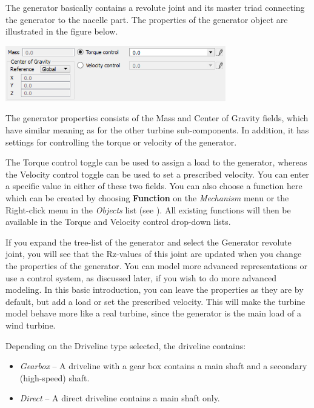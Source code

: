 
The generator basically contains a revolute joint and its master triad
connecting the generator to the nacelle part. The properties of the
generator object are illustrated in the figure below.

\includegraphics[width=0.72\textwidth]{Figures/3b-Generator}

The generator properties consists of the Mass and Center of Gravity fields,
which have similar meaning as for the other turbine sub-components. In addition,
it has settings for controlling the torque or velocity of the generator.

The Torque control toggle can be used to assign a load to the generator,
whereas the Velocity control toggle can be used to set a prescribed velocity.
You can enter a specific value in either of these two fields.
You can also choose a function here which can be created by choosing
\textbf{Function} on the {\sl Mechanism} menu or the Right-click menu in the
{\sl Objects} list (see ).
All existing functions will then be available in the Torque and Velocity control
drop-down lists.

If you expand the tree-list of the generator and select the Generator
revolute joint, you will see that the Rz-values of this joint are
updated when you change the properties of the generator. You can model
more advanced representations or use a control system, as discussed later,
if you wish to do more advanced modeling. In this basic introduction,
you can leave the properties as they are by default, but add a load
or set the prescribed velocity. This will make the turbine model behave more
like a real turbine, since the generator is the main load of a wind turbine.

Depending on the Driveline type selected, the driveline contains:

\begin{itemize}
\item{\sl Gearbox} --
  A driveline with a gear box contains a main shaft and
  a secondary (high-speed) shaft.
\item{\sl Direct} --
  A direct driveline contains a main shaft only.
\end{itemize}

